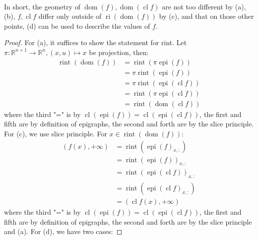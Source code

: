 \paragraph{}In short, the geometry of $\operatorname{dom}(f),\operatorname{dom}(\operatorname{cl}f)$ are not too different by (a), (b), $f,\operatorname{cl}f$ differ only outside of $\operatorname{ri}(\operatorname{dom}(f))$ by (c), and that on those other points, (d) can be used to describe the values of $f$.

\begin{proof}
	For (a), it suffices to show the statement for rint. Let $\pi:\mathbb{R}^{n+1}\to \mathbb{R}^n,(x,u)\mapsto x$ be projection, then:
	\begin{align*}
		\operatorname{rint}(\operatorname{dom}(f)) & =\operatorname{rint}(\pi \operatorname{epi}(f))                 \\
		                                           & =\pi\operatorname{rint}(\operatorname{epi}(f))                  \\
		                                           & =\pi\operatorname{rint}(\operatorname{epi}(\operatorname{cl}f)) \\
		                                           & =\operatorname{rint}(\pi\operatorname{epi}(\operatorname{cl}f)) \\
		                                           & =\operatorname{rint}(\operatorname{dom}(\operatorname{cl}f))
	\end{align*}
	where the third "=" is by $\operatorname{cl}(\operatorname{epi}(f))=\operatorname{cl}(\operatorname{epi}(\operatorname{cl}f))$, the first and fifth are by definition of epigraphs, the second and forth are by the slice principle. For (c), we use slice principle. For $x\in \operatorname{rint}(\operatorname{dom}(f))$:
	\begin{align*}
		(f(x),+\infty) & =\operatorname{rint}(\operatorname{epi}(f)_{x,:})                  \\
		               & =\operatorname{rint}(\operatorname{epi}(f))_{x,:}                  \\
		               & =\operatorname{rint}(\operatorname{epi}(\operatorname{cl}f))_{x,:} \\
		               & =\operatorname{rint}(\operatorname{epi}(\operatorname{cl}f)_{x,:}) \\
		               & =(\operatorname{cl}f(x),+\infty)
	\end{align*}
	where the third "=" is by $\operatorname{cl}(\operatorname{epi}(f))=\operatorname{cl}(\operatorname{epi}(\operatorname{cl}f))$, the first and fifth are by definition of epigraphs, the second and forth are by the slice principle and (a). For (d), we have two cases:

\end{proof}
